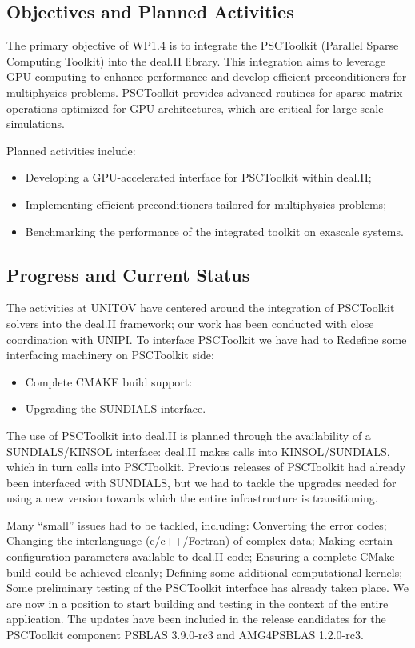 \documentclass[a4paper,12pt]{article}
\begin{document}
    \subsection{Objectives and Planned Activities}
        The primary objective of WP1.4 is to integrate the PSCToolkit (Parallel Sparse Computing Toolkit) into the deal.II library. This integration aims to leverage GPU computing to enhance performance and develop efficient preconditioners for multiphysics problems. PSCToolkit provides advanced routines for sparse matrix operations optimized for GPU architectures, which are critical for large-scale simulations.

        Planned activities include:
        \begin{itemize}
            \item Developing a GPU-accelerated interface for PSCToolkit within deal.II;
            \item Implementing efficient preconditioners tailored for multiphysics problems;
            \item Benchmarking the performance of the integrated toolkit on exascale systems.
        \end{itemize}

        \subsection{Progress and Current Status}
 
The activities at UNITOV have centered around the integration of PSCToolkit solvers into the deal.II framework; our work has been conducted with close coordination with UNIPI. 
To interface PSCToolkit we have had to 
Redefine some interfacing machinery on PSCToolkit side:
\begin{itemize}
\item Complete CMAKE build support:
\item Upgrading the SUNDIALS interface.
\end{itemize}
The use of PSCToolkit into deal.II is planned through the availability of a SUNDIALS/KINSOL interface: deal.II makes calls into KINSOL/SUNDIALS, which in turn calls into PSCToolkit. Previous releases of PSCToolkit had already been interfaced with SUNDIALS, but we had to tackle the upgrades needed for using a new version towards which the entire infrastructure is transitioning. 

Many “small” issues had to be tackled, including: 
Converting the error codes;
Changing the interlanguage (c/c++/Fortran) of complex data;
Making certain configuration parameters available to deal.II code;
Ensuring a complete CMake build could be achieved cleanly;
Defining some additional computational kernels;
Some preliminary testing of the PSCToolkit interface has already taken place.
We are now in a position to start building and testing in the context of the entire application.
The updates have been included in the release candidates for the PSCToolkit component PSBLAS 3.9.0-rc3 and AMG4PSBLAS 1.2.0-rc3.
\end{document}

